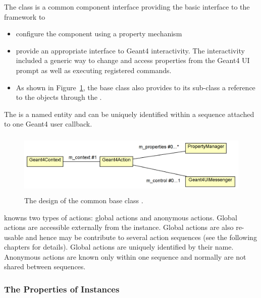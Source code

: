 \documentclass[10pt,a4paper]{article}
\begin{document}
\noindent
The class  is a common component interface providing 
the basic interface to the framework to
\begin{itemize}\itemcompact
\item configure the component using a property mechanism
\item provide an appropriate interface to Geant4 interactivity. The interactivity 
    included a generic way to change and access properties from the Geant4 UI 
    prompt as well as executing registered commands.
\item As shown in Figure~\ref{fig:ddg4-implementation-geant4-action}, the 
    base class also provides to its sub-class a reference to the 
    objects through the .
\end{itemize}
The  is a named entity and can be uniquely identified within
a sequence attached to one Geant4 user callback.
\begin{figure}[h]
  \begin{center}
    \includegraphics[height=30mm] {DDG4-Geant4Action.png}
    \caption{The design of the common base class .}
    \label{fig:ddg4-implementation-geant4-action}
  \end{center}
\end{figure}

\noindent
\DDG knowns two types of actions: global actions and anonymous actions.
Global actions are accessible externally from the  instance.
Global actions are also re-usable and hence may be contribute to several 
action sequences (see the following chapters for details). Global actions 
are uniquely identified by their name.
Anonymous actions are known only within one sequence and normally
are not shared between sequences.

\subsubsection{The Properties of  Instances}
\label{sec:ddg4-implementation-geant4-action-properties}
\end{document}
